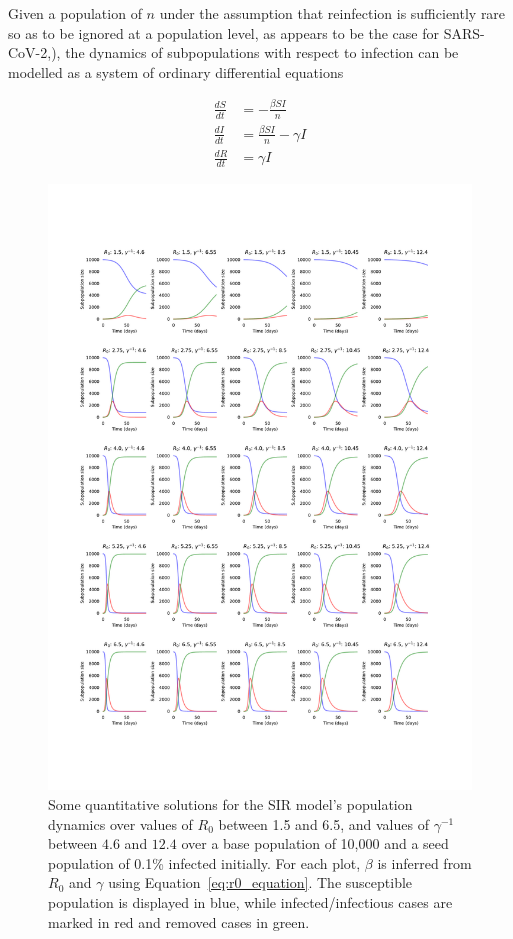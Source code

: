 \documentclass[12pt]{article}
\begin{document}
Given a population of $n$ under the assumption that reinfection is sufficiently rare so as to be ignored at a population level, as appears to be the case for SARS-CoV-2,\cite{edridge2020human,deng2020primary,Bao:2020aa}), the dynamics of subpopulations with respect to infection can be modelled as a system of ordinary differential equations

\begin{equation}
	\begin{aligned}
		\frac{dS}{dt} &= - \frac{\beta S I}{n} 								\\
		\frac{dI}{dt} &= \frac{\beta S I}{n} - \gamma I 					\\
		\frac{dR}{dt} &= \gamma I
	\end{aligned}
	\label{eq:sir_equation}
\end{equation}


\begin{figure}
	\includegraphics[width=0.8\linewidth]{figures/fig1-odes}
	\centering
	\caption{Some quantitative solutions for the SIR model's population dynamics over values of $R_0$ between 1.5 and 6.5, and values of $\gamma^{-1}$ between $4.6$ and $12.4$ over a base population of 10,000 and a seed population of 0.1\% infected initially. For each plot, $\beta$ is inferred from $R_0$ and $\gamma$ using Equation~\eqref{eq:r0_equation}. The susceptible population is displayed in blue, while infected/infectious cases are marked in red and removed cases in green.}
	\label{fig:ode_solutions}
\end{figure}
\end{document}
